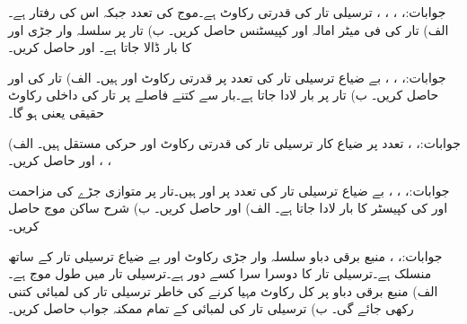 جوابات:، ، ، ، 
ترسیلی تار کی قدرتی رکاوٹ  ہے۔موج کی تعدد  جبکہ اس کی رفتار  ہے۔ الف) تار کی فی میٹر امالہ اور کپیسٹنس حاصل کریں۔ ب) تار پر سلسلہ وار جڑی  اور  کا بار ڈالا جاتا ہے۔  اور  حاصل کریں۔

جوابات:، ، ، 
بے ضیاع ترسیلی تار کی  تعدد پر قدرتی رکاوٹ  اور  ہیں۔ الف) تار کی  اور  حاصل کریں۔ ب) تار پر  بار لادا جاتا ہے۔بار سے کتنے فاصلے پر تار کی داخلی رکاوٹ  حقیقی  یعنی  ہو گا۔

جوابات:، ،  
تعدد  پر ضیاع کار ترسیلی تار کی قدرتی رکاوٹ   اور حرکی مستقل  ہیں۔ الف) ، ،  اور  حاصل کریں۔

جوابات:، ، ، 
بے ضیاع ترسیلی تار کی  تعدد پر  اور  ہیں۔تار پر متوازی جڑے  کی مزاحمت اور  کی کپیسٹر کا بار لادا جاتا ہے۔ الف)  اور  حاصل کریں۔ ب) شرح ساکن موج حاصل کریں۔

جوابات:، ، 
منبع برقی دباو سلسلہ وار جڑی رکاوٹ  اور بے ضیاع ترسیلی تار کے ساتھ منسلک ہے۔ترسیلی تار کا دوسرا سرا کسے دور ہے۔ترسیلی تار میں طول موج  ہے۔ الف) منبع برقی دباو پر کل  رکاوٹ مہیا کرنے کی خاطر ترسیلی تار کی لمبائی کتنی رکھی جائے گی۔ ب) ترسیلی تار کی لمبائی کے  تمام ممکنہ جواب حاصل کریں۔

